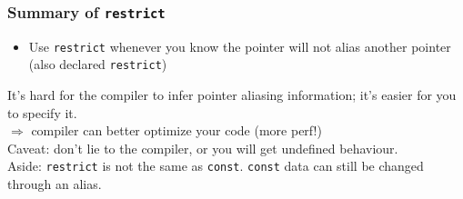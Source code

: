 \documentclass[aspectratio=43]{beamer}
\newenvironment{changemargin}[1]{%
  \begin{list}{}{%
    \setlength{\topsep}{0pt}%
    \setlength{\leftmargin}{#1}%
    \setlength{\rightmargin}{1em}
    \setlength{\listparindent}{\parindent}%
    \setlength{\itemindent}{\parindent}%
    \setlength{\parsep}{\parskip}%
  }%
  \item[]}{\end{list}}
\begin{document}
\begin{frame}[fragile]
  \frametitle{Summary of {\tt restrict}}

  \begin{changemargin}{2.5cm}
  \begin{itemize}
    \item Use {\tt restrict} whenever you know the pointer will not alias
      another pointer (also declared {\tt restrict})
  \end{itemize}

    It's hard for the compiler to infer pointer aliasing information;
    it's easier for you to specify it.\\[1em]

    $\Rightarrow$ compiler can better optimize your code (more perf!)\\[1em]

    Caveat: don't lie to the compiler, or  you will get
      \alert{undefined behaviour}.\\[1em]

    Aside: {\tt restrict} is not the same as {\tt const}. {\tt const} data can still be
      changed through an alias.
  \end{changemargin}
\end{frame}
\end{document}
